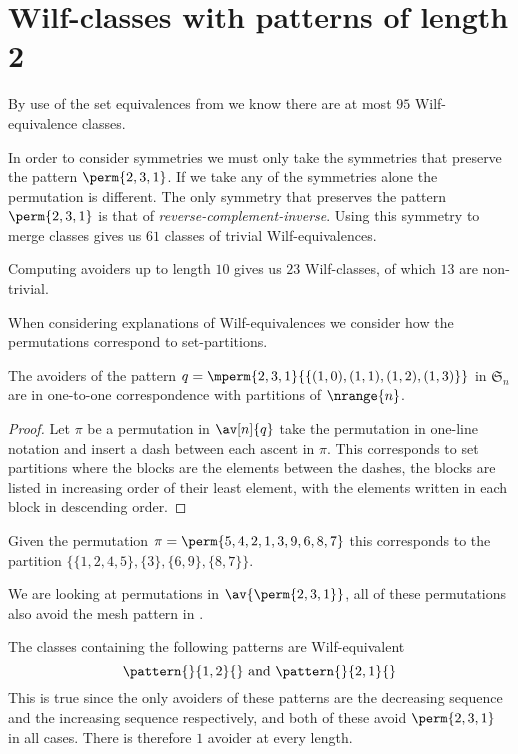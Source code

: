 \section{Wilf-classes with patterns of length 2}
By use of the set equivalences from  we know there are
at most \(95\) Wilf-equivalence classes.

In order to consider symmetries we must only take the symmetries that preserve
the pattern \(\perm{2,3,1}\). If we take any of the symmetries alone the
permutation is different. The only symmetry that preserves the pattern
\(\perm{2,3,1}\) is that of \emph{reverse-complement-inverse}. Using this
symmetry to merge classes gives us \(61\) classes of trivial
Wilf-equivalences.

Computing avoiders up to length \(10\) gives us \(23\) Wilf-classes,
of which \(13\) are non-trivial.

When considering explanations of Wilf-equivalences we consider how the
permutations correspond to set-partitions.

\begin{note}
    \label{not:setequiv}
    The avoiders of the pattern \(q = \mperm{2,3,1}{\{(1,0),(1,1),(1,2),(1,3)\}}\)
    in \(\mathfrak{S}_n\) are in one-to-one correspondence with partitions of
    \(\nrange{n}\). \cite{DBLP:journals/ejc/Claesson01}
\end{note}
\begin{proof}
    Let \(\pi\) be a permutation in \(\av[n]{q}\) take the permutation
    in one-line notation and insert a dash between each ascent in \(\pi\). This
    corresponds to set partitions where the blocks are the elements between the
    dashes, the blocks are listed in increasing order of their least element,
    with the elements written in each block in descending order.
\end{proof}

\begin{example}
    Given the permutation \(\pi = \perm{5,4,2,1,3,9,6,8,7}\) this corresponds to the
    partition \(\{\{1,2,4,5\},\{3\},\{6,9\},\{8,7\}\}\).
\end{example}

We are looking at permutations in \(\av{\perm{2,3,1}}\), all of these permutations
also avoid the mesh pattern in .

The classes containing the following patterns are Wilf-equivalent
\begin{equation*}
    \pattern{}{1,2}{} \text{ and }
    \pattern{}{2,1}{}
\end{equation*}
This is true since the only avoiders of these patterns are the decreasing
sequence and the increasing sequence respectively, and both of these
avoid \(\perm{2,3,1}\) in all cases. There is therefore \(1\) avoider at
every length.

